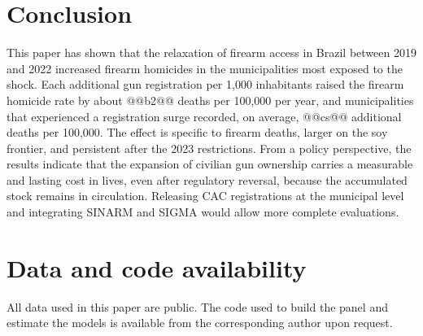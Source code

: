 \documentclass[11pt,a4paper]{article}
\begin{document}
\section{Conclusion}\label{sec:conclusao}

This paper has shown that the relaxation of firearm access in Brazil between 2019 and 2022 increased firearm homicides in the municipalities most exposed to the shock. Each additional gun registration per 1,000 inhabitants raised the firearm homicide rate by about @@b2@@ deaths per 100,000 per year, and municipalities that experienced a registration surge recorded, on average, @@cs@@ additional deaths per 100,000. The effect is specific to firearm deaths, larger on the soy frontier, and persistent after the 2023 restrictions. From a policy perspective, the results indicate that the expansion of civilian gun ownership carries a measurable and lasting cost in lives, even after regulatory reversal, because the accumulated stock remains in circulation. Releasing CAC registrations at the municipal level and integrating SINARM and SIGMA would allow more complete evaluations.

\section*{Data and code availability}
All data used in this paper are public. The code used to build the panel and estimate the models is available from the corresponding author upon request.



\end{document}
